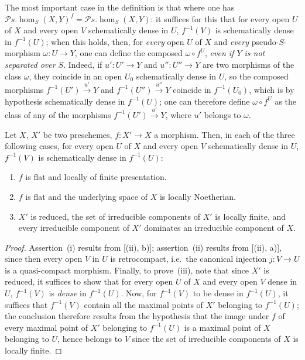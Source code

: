 \begin{env}[20.3.4]
\label{IV.20.3.4}
The most important case in the definition  is that where one has $\mathscr{P}\!s.\!\operatorname{hom}_S(X,Y)^f=\mathscr{P}\!s.\!\operatorname{hom}_S(X,Y)$:
it suffices for this that for every open $U$ of $X$ and every open $V$ schematically dense in $U$, $f^{-1}(V)$ is schematically dense in $f^{-1}(U)$;
when this holds, then, for \emph{every} open $U$ of $X$ and \emph{every} pseudo-$S$-morphism $\omega:U\to Y$, one can define the composed $\omega\circ f^U$, \emph{even if $Y$ is not separated over $S$}.
Indeed, if $u':U'\to Y$ and $u'':U''\to Y$ are two morphisms of the class $\omega$, they coincide in an open $U_0$ schematically dense in $U$, so the composed morphisms $f^{-1}(U')\xrightarrow{u'}Y$ and $f^{-1}(U'')\xrightarrow{u''}Y$ coincide in $f^{-1}(U_0)$, which is by hypothesis schematically dense in $f^{-1}(U)$;
one can therefore define $\omega\circ f^U$ as the class of any of the morphisms $f^{-1}(U')\xrightarrow{u'}Y$, where $u'$ belongs to $\omega$.
\end{env}

\begin{proposition}[20.3.5]
\label{IV.20.3.5}
Let $X$, $X'$ be two preschemes, $f:X'\to X$ a morphism.
Then, in each of the three following cases, for every open $U$ of $X$ and every open $V$ schematically dense in $U$, $f^{-1}(V)$ is schematically dense in $f^{-1}(U)$:
\begin{enumerate}[label=\emph{(\roman*)}]
  \item $f$ is flat and locally of finite presentation.
  \item $f$ is flat and the underlying space of $X$ is locally Noetherian.
  \item $X'$ is reduced, the set of irreducible components of $X'$ is locally finite, and every irreducible component of $X'$ dominates an irreducible component of $X$.
\end{enumerate}
\end{proposition}

\begin{proof}
Assertion~(i) results from [(ii), b)];
assertion~(ii) results from [(ii), a)], since then every open $V$ in $U$ is retrocompact, i.e.\ the canonical injection $j:V\to U$ is a quasi-compact morphism.
Finally, to prove~(iii), note that since $X'$ is reduced, it suffices to show that for every open $U$ of $X$ and every open $V$ dense in $U$, $f^{-1}(V)$ is \emph{dense} in $f^{-1}(U)$.
Now, for $f^{-1}(V)$ to be dense in $f^{-1}(U)$, it suffices that $f^{-1}(V)$ contain all the maximal points of $X'$ belonging to $f^{-1}(U)$;
  the conclusion therefore results from the hypothesis that the image under $f$ of every maximal point of $X'$ belonging to $f^{-1}(U)$ is a maximal point of $X$ belonging to $U$, hence belongs to $V$ since the set of irreducible components of $X$ is locally finite.
\end{proof}

